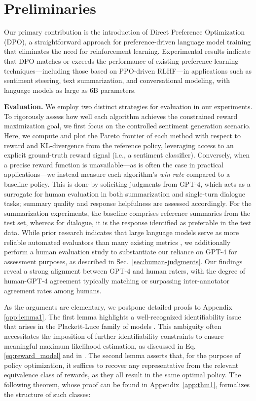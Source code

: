 \section{Preliminaries}\label{section:prelims}

Our primary contribution is the introduction of Direct Preference Optimization (DPO), a straightforward approach for preference-driven language model training that eliminates the need for reinforcement learning. Experimental results indicate that DPO matches or exceeds the performance of existing preference learning techniques—including those based on PPO-driven RLHF—in applications such as sentiment steering, text summarization, and conversational modeling, with language models as large as 6B parameters.

\textbf{Evaluation.} We employ two distinct strategies for evaluation in our experiments. To rigorously assess how well each algorithm achieves the constrained reward maximization goal, we first focus on the controlled sentiment generation scenario. Here, we compute and plot the Pareto frontier of each method with respect to reward and KL-divergence from the reference policy, leveraging access to an explicit ground-truth reward signal (i.e., a sentiment classifier). Conversely, when a precise reward function is unavailable—as is often the case in practical applications—we instead measure each algorithm's \textit{win rate} compared to a baseline policy. This is done by soliciting judgments from GPT-4, which acts as a surrogate for human evaluation in both summarization and single-turn dialogue tasks; summary quality and response helpfulness are assessed accordingly. For the summarization experiments, the baseline comprises reference summaries from the test set, whereas for dialogue, it is the response identified as preferable in the test data. While prior research indicates that large language models serve as more reliable automated evaluators than many existing metrics \citep{Chen2023ExploringTU}, we additionally perform a human evaluation study to substantiate our reliance on GPT-4 for assessment purposes, as described in Sec.~\ref{sec:human-judgments}. Our findings reveal a strong alignment between GPT-4 and human raters, with the degree of human-GPT-4 agreement typically matching or surpassing inter-annotator agreement rates among humans.

As the arguments are elementary, we postpone detailed proofs to Appendix \ref{app:lemma1}. The first lemma highlights a well-recognized identifiability issue that arises in the Plackett-Luce family of models \cite{plackett1975analysis}. This ambiguity often necessitates the imposition of further identifiability constraints to ensure meaningful maximum likelihood estimation, as discussed in Eq. \ref{eq:reward_model} and in \cite{bong2022generalized}. The second lemma asserts that, for the purpose of policy optimization, it suffices to recover any representative from the relevant equivalence class of rewards, as they all result in the same optimal policy. The following theorem, whose proof can be found in Appendix~\ref{app:thm1}, formalizes the structure of such classes:

